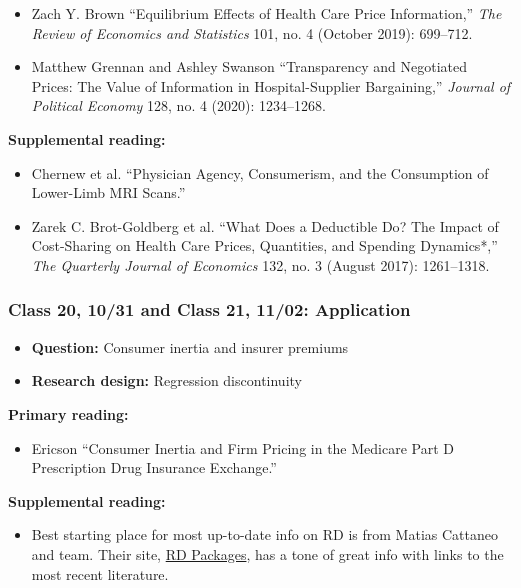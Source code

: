 \documentclass[11pt,]{article}
\providecommand{\tightlist}{%
  \setlength{\itemsep}{0pt}\setlength{\parskip}{0pt}}
\begin{document}
\begin{itemize}
\tightlist
\item
  Zach Y. Brown {``Equilibrium {Effects} of {Health} {Care} {Price}
  {Information},''} \emph{The Review of Economics and Statistics} 101,
  no. 4 (October 2019): 699--712.
\item
  Matthew Grennan and Ashley Swanson {``Transparency and Negotiated
  Prices: {The} Value of Information in Hospital-Supplier Bargaining,''}
  \emph{Journal of Political Economy} 128, no. 4 (2020): 1234--1268.
\end{itemize}

\textbf{Supplemental reading:}

\begin{itemize}
\tightlist
\item
  Chernew et al. {``Physician Agency, Consumerism, and the Consumption
  of Lower-Limb {MRI} Scans.''}
\item
  Zarek C. Brot-Goldberg et al. {``What Does a {Deductible} {Do}? {The}
  {Impact} of {Cost}-{Sharing} on {Health} {Care} {Prices},
  {Quantities}, and {Spending} {Dynamics}*,''} \emph{The Quarterly
  Journal of Economics} 132, no. 3 (August 2017): 1261--1318.
\end{itemize}

\hypertarget{class-20-1031-and-class-21-1102-application}{%
\subsubsection{Class 20, 10/31 and Class 21, 11/02:
Application}\label{class-20-1031-and-class-21-1102-application}}

\begin{itemize}
\tightlist
\item
  \textbf{Question:} Consumer inertia and insurer premiums
\item
  \textbf{Research design:} Regression discontinuity
\end{itemize}

\textbf{Primary reading:}

\begin{itemize}
\tightlist
\item
  Ericson {``Consumer Inertia and Firm Pricing in the {Medicare} {Part}
  {D} Prescription Drug Insurance Exchange.''}
\end{itemize}

\textbf{Supplemental reading:}

\begin{itemize}
\tightlist
\item
  Best starting place for most up-to-date info on RD is from Matias
  Cattaneo and team. Their site, \href{https://rdpackages.github.io/}{RD
  Packages}, has a tone of great info with links to the most recent
  literature.
\end{itemize}
\end{document}
